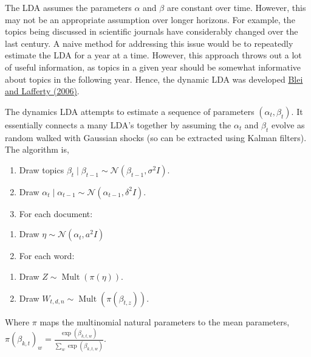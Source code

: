 \documentclass[
]{book}
\providecommand{\tightlist}{%
  \setlength{\itemsep}{0pt}\setlength{\parskip}{0pt}}
\begin{document}
The LDA assumes the parameters \(\alpha\) and \(\beta\) are constant over time. However, this may not be an appropriate assumption over longer horizons. For example, the topics being discussed in scientific journals have considerably changed over the last century. A naive method for addressing this issue would be to repeatedly estimate the LDA for a year at a time. However, this approach throws out a lot of useful information, as topics in a given year should be somewhat informative about topics in the following year. Hence, the dynamic LDA was developed \href{https://dl.acm.org/doi/10.1145/1143844.1143859}{Blei and Lafferty (2006)}.

The dynamics LDA attempts to estimate a sequence of parameters \((\alpha_t,\beta_t)\). It essentially connects a many LDA's together by assuming the \(\alpha_t\) and \(\beta_t\) evolve as random walked with Gaussian shocks (so can be extracted using Kalman filters). The algorithm is,

\begin{enumerate}
\def\labelenumi{\arabic{enumi}.}
\tightlist
\item
  Draw topics \(\beta_{t} \mid \beta_{t-1} \sim \mathcal{N}\left(\beta_{t-1}, \sigma^{2} I\right)\).
\item
  Draw \(\alpha_{t} \mid \alpha_{t-1} \sim \mathcal{N}\left(\alpha_{t-1}, \delta^{2} I\right)\).
\item
  For each document:
\end{enumerate}

\begin{enumerate}
\def\labelenumi{(\alph{enumi})}
\tightlist
\item
  Draw \(\eta \sim \mathcal{N}\left(\alpha_{t}, a^{2} I\right)\)
\item
  For each word:
\end{enumerate}

\begin{enumerate}
\def\labelenumi{\roman{enumi}.}
\tightlist
\item
  Draw \(Z \sim \operatorname{Mult}(\pi(\eta))\).
\item
  Draw \(W_{t, d, n} \sim \operatorname{Mult}\left(\pi\left(\beta_{t, z}\right)\right)\).
\end{enumerate}

Where \(\pi\) maps the multinomial natural parameters to the mean parameters, \(\pi\left(\beta_{k, t}\right)_{w}=\frac{\exp \left(\beta_{k, t, w}\right)}{\sum_{w} \exp \left(\beta_{k, t, w}\right)}\).
\end{document}
